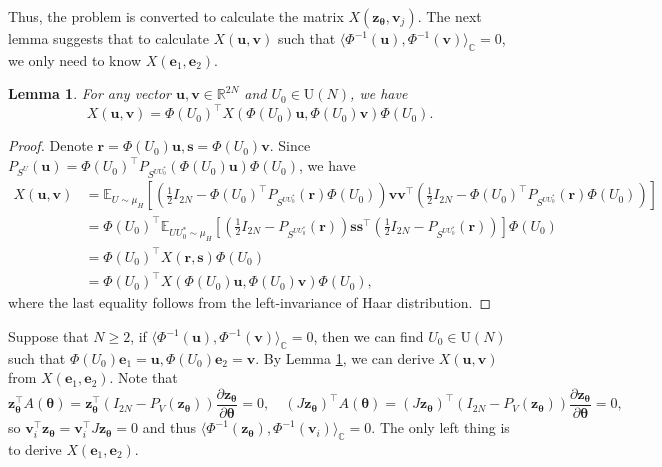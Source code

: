 \documentclass{amsart}
\theoremstyle{plain}
\newtheorem{lemma}{Lemma}
\theoremstyle{definition}
\theoremstyle{remark}
\newcommand{\RR}{\mathbb{R}}
\newcommand{\CC}{\mathbb{C}}
\newcommand{\EE}{\mathbb{E}}
\begin{document}
Thus, the problem is converted to calculate the matrix $X(\bm z_{\bm\theta},\bm v_j)$. The next lemma suggests that to calculate $X(\bm u,\bm v)$ such that $\langle\Phi^{-1}(\bm u),\Phi^{-1}(\bm v)\rangle_{\CC}=0$, we only need to know $X(\bm e_1,\bm e_2)$.
\begin{lemma}
\label{lem:X(u,v) under rotation}
    For any vector $\bm{u},\bm{v}\in\RR^{2N}$ and $U_0\in \mathrm U(N)$, we have 
    \begin{equation}
        X(\bm{u},\bm{v})=\Phi(U_0)^\top X(\Phi(U_0)\bm{u},\Phi(U_0)\bm{v})\Phi(U_0).
    \end{equation}
\end{lemma}
\begin{proof}
    Denote $\bm r=\Phi(U_0)\bm{u},\bm s=\Phi(U_0)\bm{v}$. Since $P_{S^U}(\bm{u})=\Phi(U_0)^\top P_{S^{UU_0^*}}(\Phi(U_0)\bm{u})\Phi(U_0)$, we have
    \begin{align*}
        X(\bm{u},\bm{v})&=\EE_{U\sim\mu_H}\left[\left(\frac{1}{2}I_{2N}-\Phi(U_0)^\top P_{S^{UU_0^*}}(\bm{r})\Phi(U_0)\right)\bm{v}\bm{v}^\top\left(\frac{1}{2}I_{2N}-\Phi(U_0)^\top P_{S^{UU_0^*}}(\bm{r})\Phi(U_0)\right)\right]\\
        &=\Phi(U_0)^\top\EE_{UU_0^*\sim\mu_H}\left[\left(\frac{1}{2}I_{2N}-P_{S^{UU_0^*}}(\bm r)\right)\bm s\bm s^\top\left(\frac{1}{2}I_{2N}-P_{S^{UU_0^*}}(\bm r)\right)\right]\Phi(U_0)\\
        &=\Phi(U_0)^\top X(\bm{r},\bm s)\Phi(U_0)\\
        &=\Phi(U_0)^\top X(\Phi(U_0)\bm{u},\Phi(U_0)\bm{v})\Phi(U_0),
    \end{align*}
where the last equality follows from the left-invariance of Haar distribution.
\end{proof}
Suppose that $N\geq 2$, if $\langle\Phi^{-1}(\bm u),\Phi^{-1}(\bm v)\rangle_{\CC}=0$, then we can find $U_0\in \mathrm U(N)$ such that $\Phi(U_0)\bm e_1=\bm u,\Phi(U_0)\bm e_2=\bm v$. By Lemma \ref{lem:X(u,v) under rotation}, we can derive $X(\bm u,\bm v)$ from $X(\bm e_1,\bm e_2)$. Note that 
\[\bm z_{\bm\theta}^\top A(\bm\theta)=\bm z_{\bm\theta}^\top (I_{2N}-P_V(\bm z_{\bm\theta}))\frac{\partial\bm z_{\bm\theta}}{\partial\bm\theta}=0,\quad (J\bm z_{\bm\theta})^\top A(\bm\theta)=(J\bm z_{\bm\theta})^\top (I_{2N}-P_V(\bm z_{\bm\theta}))\frac{\partial\bm z_{\bm\theta}}{\partial\bm\theta}=0,\] so $\bm v_i^\top \bm z_{\bm\theta}=\bm v_i^\top J\bm z_{\bm\theta}=0$ and thus $\langle\Phi^{-1}(\bm z_{\bm\theta}),\Phi^{-1}(\bm v_i)\rangle_{\CC}=0$. The only left thing is to derive $X(\bm e_1,\bm e_2)$.
\end{document}
